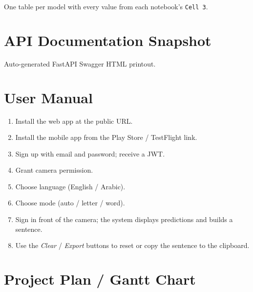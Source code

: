 One table per model with every value from each notebook's
\texttt{Cell~3}.

\chapter{API Documentation Snapshot}
\label{app:api}

Auto-generated FastAPI Swagger HTML printout.

\chapter{User Manual}
\label{app:manual}

\begin{enumerate}
  \item Install the web app at the public URL.
  \item Install the mobile app from the Play Store / TestFlight link.
  \item Sign up with email and password; receive a JWT.
  \item Grant camera permission.
  \item Choose language (English / Arabic).
  \item Choose mode (auto / letter / word).
  \item Sign in front of the camera; the system displays predictions and
        builds a sentence.
  \item Use the \emph{Clear} / \emph{Export} buttons to reset or copy
        the sentence to the clipboard.
\end{enumerate}

\chapter{Project Plan / Gantt Chart}
\label{app:plan}

